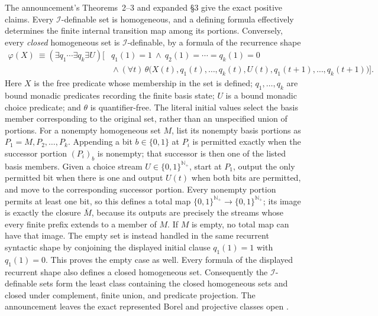 The announcement's Theorems~2--3 and expanded \S3 give the exact positive
claims.  Every \(\mathcal I\)-definable set is homogeneous, and a defining
formula effectively determines the finite internal transition map among its
portions.  Conversely, every \emph{closed} homogeneous set is
\(\mathcal I\)-definable, by a formula of the recurrence shape
\[
 \begin{aligned}
  \varphi(X)\ \equiv
  (\exists q_1\cdots\exists q_k\exists U)\bigl[&
    q_1(1)=1\ \land\ q_2(1)=\cdots=q_k(1)=0\\
    &{}\land(\forall t)\,
    \theta\bigl(X(t),q_1(t),\ldots,q_k(t),U(t),
                 q_1(t+1),\ldots,q_k(t+1)\bigr)
  \bigr].
 \end{aligned}
\]
Here \(X\) is the free predicate whose membership in the set is defined;
\(q_1,\ldots,q_k\) are bound monadic predicates recording the finite basis
state; \(U\) is a bound monadic choice predicate; and \(\theta\) is
quantifier-free.  The literal initial values select the basis member
corresponding to the original set, rather than an unspecified union of
portions.  For a nonempty homogeneous set \(M\), list its nonempty basis
portions as \(P_1=M,P_2,\ldots,P_k\).  Appending a bit \(b\in\{0,1\}\) at
\(P_i\) is permitted exactly when the successor portion \((P_i)_b\) is
nonempty; that successor is then one of the listed basis members.  Given a
choice stream \(U\in\{0,1\}^{\mathbb N_+}\), start at \(P_1\), output the
only permitted bit when there is one and output \(U(t)\) when both bits are
permitted, and move to the corresponding successor portion.  Every nonempty
portion permits at least one bit, so this defines a total map
\(\{0,1\}^{\mathbb N_+}\to\{0,1\}^{\mathbb N_+}\); its image is exactly the
closure \(\overline M\), because its outputs are precisely the streams whose every
finite prefix extends to a member of \(M\).  If \(M\) is empty, no total map
can have that image.  The empty set is instead handled in the same recurrent
syntactic shape by conjoining the displayed initial clause \(q_1(1)=1\) with
\(q_1(1)=0\).  This proves the empty case as well.  Every formula of
the displayed recurrent shape also defines a closed homogeneous set.
Consequently the \(\mathcal I\)-definable sets form the
least class containing the closed homogeneous sets and closed under
complement, finite union, and predicate projection.  The announcement leaves
the exact represented Borel and projective classes open
\cite[pp.~326--328]{Trakhtenbrot1961}
\cite[pp.~113--119]{Trakhtenbrot1962Expanded}.

